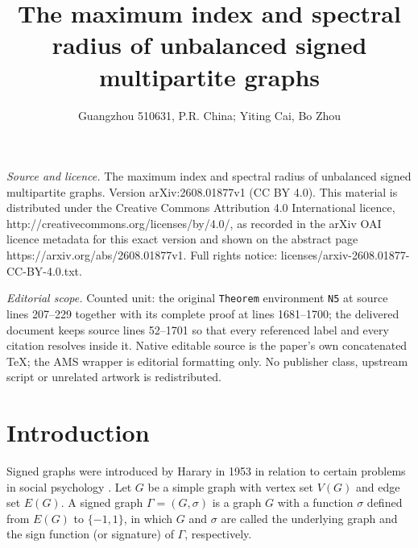 \documentclass[10pt,a4paper]{amsart}
\numberwithin{equation}{section}
\begin{document}
\title[The maximum index and spectral radius of unbalanced signed m]{The maximum index and spectral radius of unbalanced signed multipartite graphs}
\author{Guangzhou 510631, P.R. China; Yiting Cai, Bo Zhou}
\date{}
\maketitle
\noindent\emph{Source and licence.} The maximum index and spectral radius of unbalanced signed multipartite graphs. Version arXiv:2608.01877v1 (CC BY 4.0). This material is distributed under the Creative Commons Attribution 4.0 International licence, http://creativecommons.org/licenses/by/4.0/, as recorded in the arXiv OAI licence metadata for this exact version and shown on the abstract page https://arxiv.org/abs/2608.01877v1. Full rights notice: licenses/arxiv-2608.01877-CC-BY-4.0.txt.\par\smallskip
\noindent\textit{Editorial scope.} Counted unit: the original \texttt{Theorem} environment \texttt{N5} at source lines 207--229 together with its complete proof at lines 1681--1700; the delivered document keeps source lines 52--1701 so that every referenced label and every citation resolves inside it. Native editable source is the paper's own concatenated TeX; the AMS wrapper is editorial formatting only. No publisher class, upstream script or unrelated artwork is redistributed.
\section{Introduction}

Signed graphs were introduced by Harary in 1953 in relation to certain problems in social psychology \cite{Ha}. 
Let $G$ be a simple graph with vertex set $V(G)$ and edge set $E(G)$.
A signed graph $\Gamma=(G, \sigma)$ is a graph $G$ with a function $\sigma$ defined from  $E(G)$ to $\{-1,1\}$, in which $G$ and $\sigma$ are called the underlying graph and the sign function (or signature) of $\Gamma$, respectively. 
\end{document}
